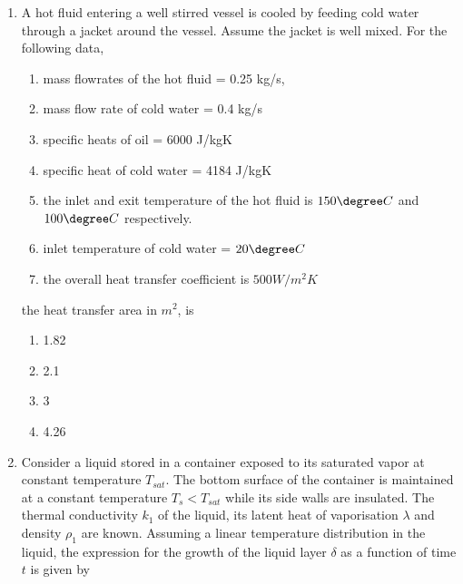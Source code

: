 \documentclass[journal,12pt,onecolumn]{IEEEtran}
\theoremstyle{remark}
\begin{document}
\begin{enumerate}
    the outlet temperature of water in $\degree C$ is.
\begin{multicols}{4}
    \begin{enumerate}
        \item 28
        \item 37
        \item 62
        \item 96
    \end{enumerate}
\end{multicols}

    \item A hot fluid entering a well stirred vessel is cooled by feeding cold water through a jacket around the vessel. Assume the jacket is well mixed. For the following data,

    \begin{enumerate}[label =]
        \item mass flowrates of the hot fluid = 0.25 kg/s,
        \item mass flow rate of cold water = 0.4 kg/s
        \item specific heats of oil = 6000 J/kgK
        \item specific heat of cold water = 4184 J/kgK
        \item the inlet and exit temperature of the hot fluid is $150\degree C$ and $100\degree C$ respectively.
        \item inlet temperature of cold water = $20\degree C$
        \item the overall heat transfer coefficient is $500 W/m^2K$
    \end{enumerate}
the heat transfer area in $m^2$, is 
\begin{multicols}{4}
    \begin{enumerate}
        \item 1.82
        \item 2.1
        \item 3
        \item 4.26
    \end{enumerate}
\end{multicols}

    \item Consider a liquid stored in a container exposed to its saturated vapor at constant temperature $T_{sat}$. The bottom surface of the container is maintained at a constant temperature $T_s<T_{sat}$ while its side walls are insulated. The thermal conductivity $k_1$ of the liquid, its latent heat of vaporisation $\lambda$ and density $\rho_1$ are known. Assuming a linear temperature distribution in the liquid, the expression for the growth of the liquid layer $\delta$ as a function of time $t$ is given by


\end{enumerate}
\end{document}
